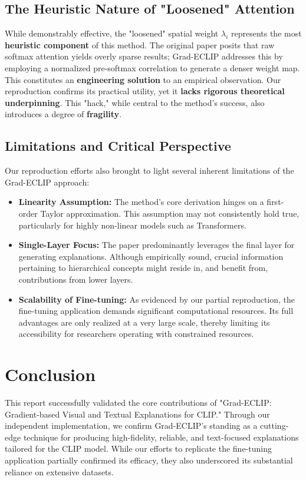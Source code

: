 \documentclass[10pt]{article} %
\begin{document}
\subsection{The Heuristic Nature of "Loosened" Attention}

While demonstrably effective, the "loosened" spatial weight $\lambda_i$ represents the most \textbf{heuristic component} of this method. The original paper posits that raw softmax attention yields overly sparse results; Grad-ECLIP addresses this by employing a normalized pre-softmax correlation to generate a denser weight map. This constitutes an \textbf{engineering solution} to an empirical observation. Our reproduction confirms its practical utility, yet it \textbf{lacks rigorous theoretical underpinning}. This "hack," while central to the method's success, also introduces a degree of \textbf{fragility}.

\subsection{Limitations and Critical Perspective}

Our reproduction efforts also brought to light several inherent limitations of the Grad-ECLIP approach:
\begin{itemize}
    \item \textbf{Linearity Assumption:} The method's core derivation hinges on a first-order Taylor approximation. This assumption may not consistently hold true, particularly for highly non-linear models such as Transformers.
    \item \textbf{Single-Layer Focus:} The paper predominantly leverages the final layer for generating explanations. Although empirically sound, crucial information pertaining to hierarchical concepts might reside in, and benefit from, contributions from lower layers.
    \item \textbf{Scalability of Fine-tuning:} As evidenced by our partial reproduction, the fine-tuning application demands significant computational resources. Its full advantages are only realized at a very large scale, thereby limiting its accessibility for researchers operating with constrained resources.
\end{itemize}

\section{Conclusion}

This report successfully validated the core contributions of "Grad-ECLIP: Gradient-based Visual and Textual Explanations for CLIP." Through our independent implementation, we confirm Grad-ECLIP's standing as a cutting-edge technique for producing high-fidelity, reliable, and text-focused explanations tailored for the CLIP model. While our efforts to replicate the fine-tuning application partially confirmed its efficacy, they also underscored its substantial reliance on extensive datasets.
\end{document}
